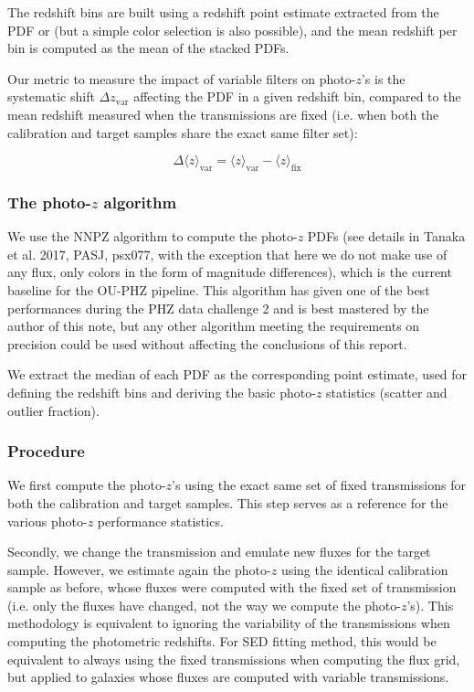 \documentclass[11pt]{article}
\begin{document}
The redshift bins are built using a redshift point estimate extracted
from the PDF or (but a simple color selection is also possible), and the
mean redshift per bin is computed as the mean of the stacked PDFs.

Our metric to measure the impact of variable filters on photo-\(z\)'s is
the systematic shift \(\Delta z_\mathrm{var}\) affecting the PDF in a
given redshift bin, compared to the mean redshift measured when the
transmissions are fixed (i.e. when both the calibration and target
samples share the exact same filter set):

    \begin{equation}
\Delta \langle z \rangle _\mathrm{var} = \langle z \rangle_\mathrm{var}- \langle z \rangle_\mathrm{fix}
\end{equation}

    \subsubsection{\texorpdfstring{The photo-\(z\)
algorithm}{The photo-z algorithm}}\label{the-photo-z-algorithm}

We use the NNPZ algorithm to compute the photo-\(z\) PDFs (see details
in Tanaka et al. 2017, PASJ, psx077, with the exception that here we do
not make use of any flux, only colors in the form of magnitude
differences), which is the current baseline for the OU-PHZ pipeline.
This algorithm has given one of the best performances during the PHZ
data challenge 2 and is best mastered by the author of this note, but
any other algorithm meeting the requirements on precision could be used
without affecting the conclusions of this report.

We extract the median of each PDF as the corresponding point estimate,
used for defining the redshift bins and deriving the basic photo-\(z\)
statistics (scatter and outlier fraction).

\subsubsection{Procedure}\label{procedure}

We first compute the photo-\(z\)'s using the exact same set of fixed
transmissions for both the calibration and target samples. This step
serves as a reference for the various photo-\(z\) performance
statistics.

Secondly, we change the transmission and emulate new fluxes for the
target sample. However, we estimate again the photo-\(z\) using the
identical calibration sample as before, whose fluxes were computed with
the fixed set of transmission (i.e. only the fluxes have changed, not
the way we compute the photo-\(z\)'s). This methodology is equivalent to
ignoring the variability of the transmissions when computing the
photometric redshifts. For SED fitting method, this would be equivalent
to always using the fixed transmissions when computing the flux grid,
but applied to galaxies whose fluxes are computed with variable
transmissions.
\end{document}
